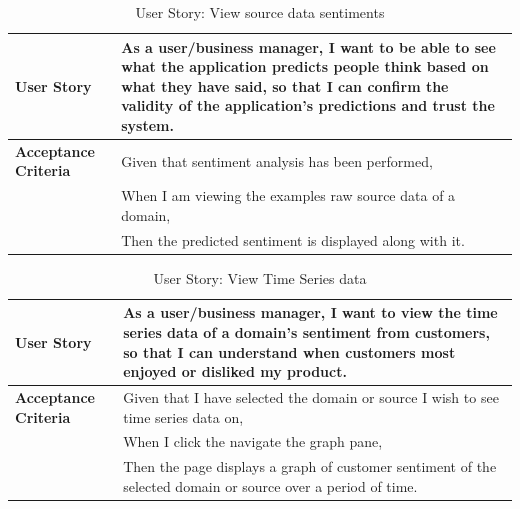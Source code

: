 \documentclass[12pt]{article}
\begin{document}
\begin{table}[htbp]
  \caption{User Story: View source data sentiments}
  \begin{tabular}{|p{}|p{}|}
    \hline
    \textbf{User Story}          & As a user/business manager, I want to be able to see what the application predicts people think based on what they have said, so that I can confirm the validity of the application’s predictions and trust the system. \\
    \hline
    \textbf{Acceptance Criteria} &
    Given that sentiment analysis has been performed,                                                                                                                                                                                                      \\
                                 & When I am viewing the examples raw source data of a domain,                                                                                                                                                             \\
                                 & Then the predicted sentiment is displayed along with it.                                                                                                                                                                \\
    \hline
  \end{tabular}
\end{table}
\newpage
\begin{table}[htbp]
  \caption{User Story: View Time Series data}
  \begin{tabular}{|p{}|p{}|}
    \hline
    \textbf{User Story}          & As a user/business manager, I want to view the time series data of a domain's sentiment from customers, so that I can understand when customers most enjoyed or disliked my product. \\
    \hline
    \textbf{Acceptance Criteria} &
    Given that I have selected the domain or source I wish to see time series data on,                                                                                                                                            \\
                                 & When I click the navigate the graph pane,                                                                                                                                               \\
                                 & Then the page displays a graph of customer sentiment of the selected domain or source over a period of time.                                                                                   \\
    \hline
  \end{tabular}
\end{table}
\end{document}

